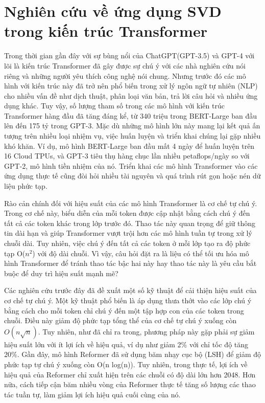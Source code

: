 \documentclass[12pt,a4paper,oneside]{report}
\numberwithin{equation}{section}
\begin{document}
\section{Nghiên cứu về ứng dụng SVD trong kiến trúc Transformer}
Trong thời gian gần đây với sự bùng nổi của ChatGPT(GPT-3.5) và GPT-4 với lõi là kiến trúc Transformer\cite{vaswani2017} đã gây được sự chú ý với các nhà nghiên cứu nói riêng và những người yêu thích công nghệ nói chung. Nhưng trước đó các mô hình với kiến trúc này đã trở nên phổ biến trong xử lý ngôn ngữ tự nhiên (NLP) cho nhiều vấn đề như dịch thuật\cite{ott2018}, phân loại văn bản, trả lời câu hỏi và nhiều ứng dụng khác\cite{raffel2019}. Tuy vậy, số lượng tham số trong các mô hình với kiến trúc Transformer hàng đầu đã tăng đáng kể, từ 340 triệu trong BERT-Large ban đầu lên đến 175 tỷ trong GPT-3\cite{brown2020}. Mặc dù những mô hình lớn này mang lại kết quả ấn tượng trên nhiều loại nhiệm vụ, việc huấn luyện và triển khai chúng lại gặp nhiều khó khăn. Ví dụ, mô hình BERT-Large\cite{Devlin2019} ban đầu mất 4 ngày để huấn luyện trên 16 Cloud TPUs, và GPT-3 tiêu thụ hàng chục lần nhiều petaflops/ngày so với GPT-2\cite{radford2019}, mô hình tiền nhiệm của nó. Triển khai các mô hình Transformer vào các ứng dụng thực tế cũng đòi hỏi nhiều tài nguyên và quá trình rút gọn hoặc nén dữ liệu phức tạp\cite{hinton2015}.

Rào cản chính đối với hiệu suất của các mô hình Transformer là cơ chế tự chú ý. Trong cơ chế này, biểu diễn của mỗi token được cập nhật bằng cách chú ý đến tất cả các token khác trong lớp trước đó. Thao tác này quan trọng để giữ thông tin dài hạn và giúp Transformer vượt trội hơn các mô hình tuần tự trong xử lý chuỗi dài. Tuy nhiên, việc chú ý đến tất cả các token ở mỗi lớp tạo ra độ phức tạp O($n^2$) với độ dài chuỗi. Vì vậy, câu hỏi đặt ra là liệu có thể tối ưu hóa mô hình Transformer để tránh thao tác bậc hai này hay thao tác này là yêu cầu bắt buộc để duy trì hiệu suất mạnh mẽ?

Các nghiên cứu trước đây đã đề xuất một số kỹ thuật để cải thiện hiệu suất của cơ chế tự chú ý. Một kỹ thuật phổ biến là áp dụng thưa thớt vào các lớp chú ý\cite{child2019, qiu2019, beltagy2020} bằng cách cho mỗi token chỉ chú ý đến một tập hợp con của các token trong chuỗi. Điều này giảm độ phức tạp tổng thể của cơ chế tự chú ý xuống còn $O(n\sqrt{n})$\cite{child2019}. Tuy nhiên, như đã chỉ ra trong\cite{qiu2019}, phương pháp này gặp phải sự giảm hiệu suất lớn với ít lợi ích về hiệu quả, ví dụ như giảm 2\% với chỉ tốc độ tăng 20\%. Gần đây, mô hình Reformer\cite{kitaev2020} đã sử dụng băm nhạy cục bộ (LSH) để giảm độ phức tạp tự chú ý xuống còn O(n log(n)). Tuy nhiên, trong thực tế, lợi ích về hiệu quả của Reformer chỉ xuất hiện trên các chuỗi có độ dài lớn hơn 2048. Hơn nữa, cách tiếp cận băm nhiều vòng của Reformer thực tế tăng số lượng các thao tác tuần tự, làm giảm lợi ích hiệu quả cuối cùng của nó. 
\end{document}
